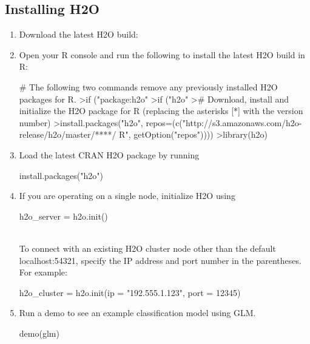 \documentclass[11pt]{article}
\begin{document}
\subsection{Installing H2O}\label{3.2}
\begin{enumerate}
\item Download the latest H2O build:  
\item Open your R console and run the following to install the latest H2O build in R:
\begin{spverbatim}
# The following two commands remove any previously installed H2O packages for R. 
>if ("package:h2o" %
>if ("h2o" %
># Download, install and initialize the H2O package for R (replacing the asterisks [*] with the version number)
>install.packages("h2o", repos=(c("http://s3.amazonaws.com/h2o-release/h2o/master/****/
R", getOption("repos"))))
>library(h2o)
\end{spverbatim}

\item Load the latest CRAN H2O package by running \begin{spverbatim} install.packages("h2o") \end{spverbatim}
\item If you are operating on a single node, initialize H2O using \begin{spverbatim} h2o_server = h2o.init()\end{spverbatim}\\

To connect with an existing H2O cluster node other than the default localhost:54321, specify the IP address and port number in the parentheses. For example: \begin{spverbatim}h2o_cluster = h2o.init(ip = "192.555.1.123", port = 12345)\end{spverbatim}
\item Run a demo to see an example classification model using GLM. 
\begin{spverbatim}
demo(glm)
\end{spverbatim}
\end{enumerate}
\end{document}
